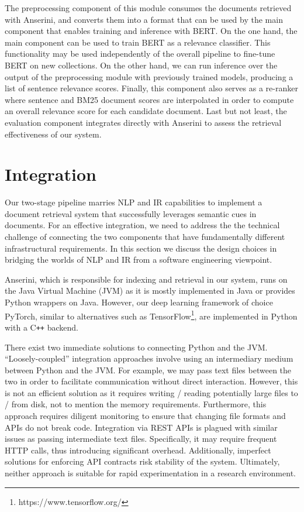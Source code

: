 The preprocessing component of this module consumes the documents retrieved with Anserini, and converts them into a format that can be used by the main component that enables training and inference with BERT.
On the one hand, the main component can be used to train BERT as a relevance classifier.
This functionality may be used independently of the overall pipeline to fine-tune BERT on new collections.
On the other hand, we can run inference over the output of the preprocessing module with previously trained models, producing a list of sentence relevance scores.
Finally, this component also serves as a re-ranker where sentence and BM25 document scores are interpolated in order to compute an overall relevance score for each candidate document.
Last but not least, the evaluation component integrates directly with Anserini to assess the retrieval effectiveness of our system.

\section{Integration}

Our two-stage pipeline marries NLP and IR capabilities to implement a document retrieval system that successfully leverages semantic cues in documents.
For an effective integration, we need to address the the technical challenge of connecting the two components that have fundamentally different infrastructural requirements.
In this section we discuss the design choices in bridging the worlds of NLP and IR from a software engineering viewpoint.

Anserini, which is responsible for indexing and retrieval in our system, runs on the Java Virtual Machine (JVM) as it is mostly implemented in Java or provides Python wrappers on Java.
However, our deep learning framework of choice PyTorch, similar to alternatives such as TensorFlow\footnote{https://www.tensorflow.org/}, are implemented in Python with a C\texttt{++} backend.

There exist two immediate solutions to connecting Python and the JVM.
``Loosely-coupled'' integration approaches involve using an intermediary medium between Python and the JVM.
For example, we may pass text files between the two in order to facilitate communication without direct interaction.
However, this is not an efficient solution as it requires writing / reading potentially large files to / from disk, not to mention the memory requirements.
Furthermore, this approach requires diligent monitoring to ensure that changing file formats and APIs do not break code.
Integration via REST APIs is plagued with similar issues as passing intermediate text files.
Specifically, it may require frequent HTTP calls, thus introducing significant overhead.
Additionally, imperfect solutions for enforcing API contracts risk stability of the system.
Ultimately, neither approach is suitable for rapid experimentation in a research environment.

